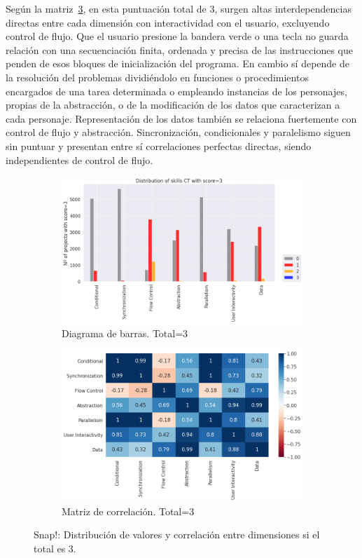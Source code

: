 \documentclass[a4paper, 12pt]{book}
\begin{document}
Según la matriz~\ref{fig:corr3_Snap}, en esta puntuación total de 3, surgen altas interdependencias directas entre cada dimensión con interactividad con el usuario, excluyendo control de flujo. Que el usuario presione la bandera verde o una tecla no guarda relación con una secuenciación finita, ordenada y precisa de las instrucciones que penden de esos bloques de inicialización del programa. En cambio sí depende de la resolución del problemas dividiéndolo en funciones o procedimientos encargados de una tarea determinada o empleando instancias de los personajes, propias de la abstracción, o de la modificación de los datos que caracterizan a cada personaje. Representación de los datos también se relaciona fuertemente con control de flujo y abstracción. Sincronización, condicionales y paralelismo siguen sin puntuar y presentan entre sí correlaciones perfectas directas, siendo independientes de control de flujo.

\begin{figure}[H]
    \centering
    \begin{subfigure}[h]{.49\textwidth} 
        \includegraphics[width=\textwidth]{img/distribucion_3_Snap}
        \caption{Diagrama de barras. Total=3}
        \label{fig:total3_Snap}
    \end{subfigure}       
    \begin{subfigure}[h]{.49\textwidth} 
        \includegraphics[width=\textwidth]{img/corr_3_Snap}
        \caption{Matriz de correlación. Total=3}
        \label{fig:corr3_Snap}
    \end{subfigure}
     \caption{Snap!: Distribución de valores y correlación entre dimensiones si el total es 3.}
\end{figure}
\end{document}
